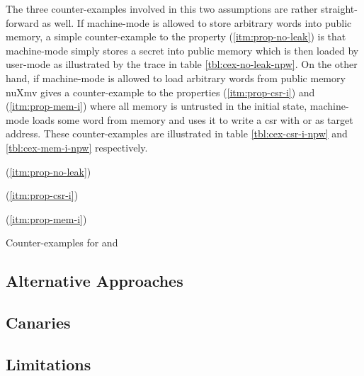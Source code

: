 The three counter-examples involved in this two assumptions are rather straight-forward as well.
If machine-mode is allowed to store arbitrary words into public memory, a simple counter-example to the  property (\ref{itm:prop-no-leak}) is that machine-mode simply stores a secret into public memory which is then loaded by user-mode as illustrated by the trace in table \ref{tbl:cex-no-leak-npw}.
On the other hand, if machine-mode is allowed to load arbitrary words from public memory nuXmv gives a counter-example to the properties  (\ref{itm:prop-csr-i}) and  (\ref{itm:prop-mem-i}) where all memory is untrusted in the initial state, machine-mode loads some word from memory and uses it to write a \gls{csr} with or as target address.
These counter-examples are illustrated in table \ref{tbl:cex-csr-i-npw} and \ref{tbl:cex-mem-i-npw} respectively.

\begin{table}
    \begin{subtable}{\textwidth}
        \centering
        
        \caption{ (\ref{itm:prop-no-leak})}
        \label{tbl:cex-no-leak-npw}
    \end{subtable}

    \begin{subtable}{\textwidth}
        \centering
        
        \caption{ (\ref{itm:prop-csr-i})}
        \label{tbl:cex-csr-i-npw}
    \end{subtable}

    \begin{subtable}{\textwidth}
        \centering
        
        \caption{ (\ref{itm:prop-mem-i})}
        \label{tbl:cex-mem-i-npw}
    \end{subtable}
    \caption{Counter-examples for  and }
\end{table}

\subsection{Alternative Approaches}
\label{sec:alt-approaches}

\subsection{Canaries}
\label{sec:canaries}

\subsection{Limitations}
